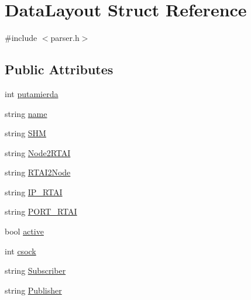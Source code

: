 \hypertarget{structDataLayout}{
\section{DataLayout Struct Reference}
\label{structDataLayout}
}


{\ttfamily \#include $<$parser.h$>$}

\subsection*{Public Attributes}
\begin{DoxyCompactItemize}
\item 
int \hyperlink{structDataLayout_aa1592c16757fab1045b59a6401cc5fc3}{putamierda}
\item 
string \hyperlink{structDataLayout_abc69ed4051c362233a39d99ecb3052c0}{name}
\item 
string \hyperlink{structDataLayout_a54625c36788a43db621a7c960cdb1eb0}{SHM}
\item 
string \hyperlink{structDataLayout_a16a8e2456d4bb863acc7d0e211fdc109}{Node2RTAI}
\item 
string \hyperlink{structDataLayout_a7c8d32e6ccc22a6555aacd42c5d2038d}{RTAI2Node}
\item 
string \hyperlink{structDataLayout_ab3da073ec0350612c5fd5cec7bb42ab1}{IP\_\-RTAI}
\item 
string \hyperlink{structDataLayout_a53199b1a7dec9a22f699bb52c29ad6bf}{PORT\_\-RTAI}
\item 
bool \hyperlink{structDataLayout_a6edd6e1e8651c1d7b40112af56f7b3c7}{active}
\item 
int \hyperlink{structDataLayout_afa6d157ac2c2c14a876d830f2b97df6f}{csock}
\item 
string \hyperlink{structDataLayout_a8ef8c1f2118099756c0f3110b90af218}{Subscriber}
\item 
string \hyperlink{structDataLayout_abaebb94f1869d06fb8f6ac20b6aa2a73}{Publisher}
\end{DoxyCompactItemize}


